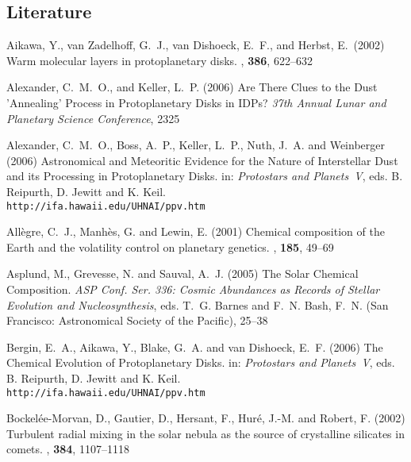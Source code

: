 \subsection{Literature}
%
%
%
\begin{literature}

\item
Aikawa, Y., van Zadelhoff, G.~J., van Dishoeck, E.~F., and Herbst, E.\ (2002)
Warm molecular layers in protoplanetary disks. \aap, \textbf{386}, 622--632


\item
Alexander, C.~M.~O., and Keller, L.~P. (2006) Are There Clues to the Dust
'Annealing' Process in Protoplanetary Disks in IDPs? \textit{37th Annual Lunar and Planetary Science Conference}, 2325

\item
Alexander, C.~M.~O., Boss, A.~P., Keller, L.~P., Nuth, J.~A. and Weinberger
(2006) Astronomical and Meteoritic Evidence for the Nature of Interstellar Dust
and its Processing in Protoplanetary Disks. in: \textit{Protostars and
Planets~V\/}, eds. B. Reipurth, D. Jewitt and K. Keil.\\ 
  {\tt http://ifa.hawaii.edu/UHNAI/ppv.htm}

\item
All\`egre, C.~J., Manh\`es, G. and Lewin, E. (2001) Chemical composition of the
Earth and the volatility control on planetary genetics. \epsl, \textbf{185},
49--69

\item
Asplund, M., Grevesse, N. and Sauval, A.~J. (2005) The Solar Chemical
Composition. \textit{ASP Conf. Ser. 336: Cosmic Abundances as Records of Stellar
Evolution and Nucleosynthesis}, eds. T.~G. Barnes and F.~N. Bash, F.~N.
(San Francisco: Astronomical Society of the Pacific), 25--38

\item
Bergin, E.~A., Aikawa, Y., Blake, G.~A. and van Dishoeck, E.~F. (2006) The
Chemical Evolution of Protoplanetary Disks.  in: \textit{Protostars and
Planets~V\/}, eds. B. Reipurth, D. Jewitt and K. Keil.\\ 
  {\tt http://ifa.hawaii.edu/UHNAI/ppv.htm}

\item
Bockel{\'e}e-Morvan, D., Gautier, D., Hersant, F., Hur{\'e}, J.-M. and Robert,
F. (2002) Turbulent radial mixing in the solar nebula as the source of
crystalline silicates in comets. \aap, \textbf{384}, 1107--1118


\end{literature}
